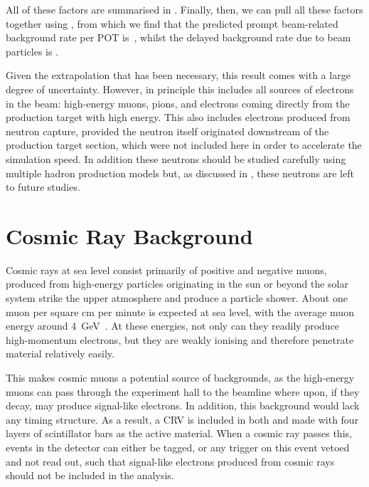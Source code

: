 \TabBgBeamFactors
All of these factors are summarised in .
Finally, then, we can pull all these factors together using , from which we find that the predicted prompt beam-related background rate per POT is~\VarBeamBgPromptPerPOT, whilst the delayed background rate due to beam particles is \VarBeamBgDelayedPerPOT.

Given the extrapolation that has been necessary, this result comes with a large degree of uncertainty.
However, in principle this includes all sources of electrons in the beam: high-energy muons, pions, and electrons coming directly from the production target with high energy.
This also includes electrons produced from neutron capture, provided the neutron itself originated downstream of the production target section, which were not included here in order to accelerate the simulation speed.
In addition these neutrons should be studied carefully using multiple hadron production models but, as discussed in , these neutrons are left to future studies.

\section{Cosmic Ray Background}
\FigBgCosmicPrimary
Cosmic rays at sea level consist primarily of positive and negative muons, produced from high-energy particles originating in the sun or beyond the solar system strike the upper atmosphere and produce a particle shower.
About one muon per square cm per minute is expected at sea level, with the average muon energy around 4~GeV~\cite{PDG2014}.
At these energies, not only can they readily produce high-momentum electrons, but they are weakly ionising and therefore penetrate material relatively easily.

This makes cosmic muons a potential source of backgrounds, as the high-energy muons can pass through the experiment hall to the beamline where upon, if they decay, may produce signal-like electrons.
In addition, this background would lack any timing structure.
As a result, a  \ac{CRV} is included in both \phaseI and \phaseII made with four layers of scintillator bars as the active material.
When a cosmic ray passes this, events in the detector can either be tagged, or any trigger on this event vetoed and not read out, such that signal-like electrons produced from cosmic rays should not be included in the analysis.

